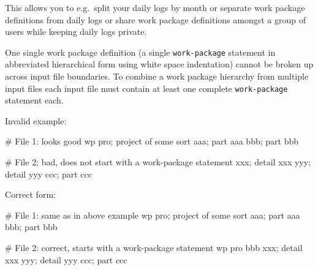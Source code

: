 \documentclass[11pt]{article}
\begin{document}
This allows you to e.g.\ split your daily logs by month or separate work package definitions from daily logs or share work package definitions amongst a group of users while keeping daily logs private.

One single work package definition (a single \verb:work-package: statement in abbreviated hierarchical form using white space indentation) cannot be broken up across input file boundaries. To combine a work package hierarchy from multiple input files each input file must contain at least one complete \verb:work-package: statement each.

Invalid example:

\begin{inputfile}
# File 1: looks good
wp pro; project of some sort
    aaa; part aaa
    bbb; part bbb
\end{inputfile}

\begin{inputfile}
# File 2; bad, does not start with a work-package statement
        xxx; detail xxx
        yyy; detail yyy
    ccc; part ccc
\end{inputfile}

Correct form:

\begin{inputfile}
# File 1: same as in above example
wp pro; project of some sort
    aaa; part aaa
    bbb; part bbb
\end{inputfile}

\begin{inputfile}
# File 2: correct, starts with a work-package statement
wp pro
    bbb
        xxx; detail xxx
        yyy; detail yyy
    ccc; part ccc
\end{inputfile}
\end{document}
